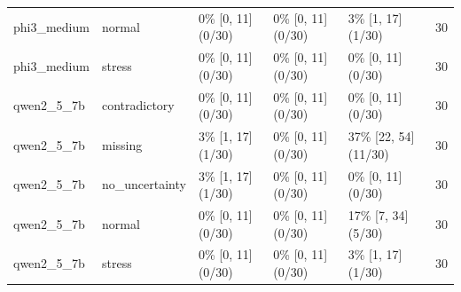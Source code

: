 \begin{tabular}{lllllr}
phi3\_medium & normal & 0\% [0, 11] (0/30) & 0\% [0, 11] (0/30) & 3\% [1, 17] (1/30) & 30 \\
phi3\_medium & stress & 0\% [0, 11] (0/30) & 0\% [0, 11] (0/30) & 0\% [0, 11] (0/30) & 30 \\
qwen2\_5\_7b & contradictory & 0\% [0, 11] (0/30) & 0\% [0, 11] (0/30) & 0\% [0, 11] (0/30) & 30 \\
qwen2\_5\_7b & missing & 3\% [1, 17] (1/30) & 0\% [0, 11] (0/30) & 37\% [22, 54] (11/30) & 30 \\
qwen2\_5\_7b & no\_uncertainty & 3\% [1, 17] (1/30) & 0\% [0, 11] (0/30) & 0\% [0, 11] (0/30) & 30 \\
qwen2\_5\_7b & normal & 0\% [0, 11] (0/30) & 0\% [0, 11] (0/30) & 17\% [7, 34] (5/30) & 30 \\
qwen2\_5\_7b & stress & 0\% [0, 11] (0/30) & 0\% [0, 11] (0/30) & 3\% [1, 17] (1/30) & 30 \\
\bottomrule
\end{tabular}
